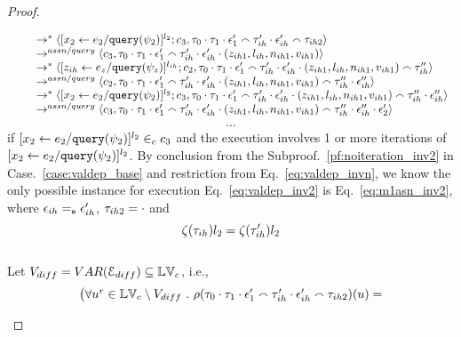 \begin{proof}
\begin{case}
\begin{subcase}
\begin{subsubcase}
\begin{subsubsubcase}
\[\begin{array}{l}
  \qquad \rightarrow^{*} 
  \langle [\mathrel{ {x}_2 \leftarrow e_2 / {\tt query}(\psi_2) }]^{l_2};{c}_3, 
  \mathtt{\tau}_0 \cdot \mathtt{\tau}_1 \cdot \mathtt{\epsilon}_1'  \smallfrown \mathtt{\tau}_{ih}' \cdot \mathtt{\epsilon}_{ih}' \smallfrown \mathtt{\tau}_{ih2} \rangle 
  \\ \qquad
  \rightarrow^{assn/query} 
  \langle {c}_3,  \mathtt{\tau}_0 \cdot \mathtt{\tau}_1 \cdot \mathtt{\epsilon}_1'  \smallfrown \mathtt{\tau}_{ih}' \cdot \mathtt{\epsilon}_{ih}' \cdot (z_{ih1}, l_{ih}, n_{ih1}, v_{ih1}) \rangle 
  \\ \qquad
  \rightarrow^{*} 
  \langle [\mathrel{ z_{ih} \leftarrow e_z / {\tt query}(\psi_z) }]^{l_{ih}};{c}_2, 
  \mathtt{\tau}_0 \cdot \mathtt{\tau}_1 \cdot \mathtt{\epsilon}_1' \smallfrown \mathtt{\tau}_{ih}' \cdot \mathtt{\epsilon}_{ih}' \cdot (z_{ih1}, l_{ih}, n_{ih1}, v_{ih1}) \smallfrown \mathtt{\tau}_{ih}'' \rangle 
  \\ \qquad
  \rightarrow^{assn/query} 
  \langle {c}_2,  \mathtt{\tau}_0 \cdot \mathtt{\tau}_1 \cdot \mathtt{\epsilon}_1'  \smallfrown \mathtt{\tau}_{ih}' \cdot \mathtt{\epsilon}_{ih}' \cdot (z_{ih1}, l_{ih}, n_{ih1}, v_{ih1}) \smallfrown \mathtt{\tau}_{ih}'' \cdot \mathtt{\epsilon}_{ih}'' \rangle  
  \\
  \qquad \rightarrow^{*} 
  \langle [\mathrel{ {x}_2 \leftarrow e_2 / {\tt query}(\psi_2) }]^{l_2};{c}_3, 
  \mathtt{\tau}_0 \cdot \mathtt{\tau}_1 \cdot \mathtt{\epsilon}_1'  \smallfrown \mathtt{\tau}_{ih}' \cdot \mathtt{\epsilon}_{ih}' \cdot (z_{ih1}, l_{ih}, n_{ih1}, v_{ih1}) \smallfrown \mathtt{\tau}_{ih}'' \cdot \mathtt{\epsilon}_{ih}'' \rangle 
  \\ \qquad
  \rightarrow^{assn/query} 
  \langle {c}_3,  \mathtt{\tau}_0 \cdot \mathtt{\tau}_1 \cdot \mathtt{\epsilon}_1' \smallfrown \mathtt{\tau}_{ih}' \cdot \mathtt{\epsilon}_{ih}' \cdot (z_{ih1}, l_{ih}, n_{ih1}, v_{ih1}) \smallfrown \mathtt{\tau}_{ih}'' \cdot \mathtt{\epsilon}_{ih}''\cdot \mathtt{\epsilon}_2' \rangle 
\end{array}
\]
%
 \[\cdots\]
 if $[\mathrel{ {x}_2 \leftarrow e_2 / {\tt query}(\psi_2) }]^{l_2} \in_c c_3$ and the execution involves 1 or more iterations of $[\mathrel{ {x}_2 \leftarrow e_2 / {\tt query}(\psi_2) }]^{l_2}$.
 By conclusion from the Subproof.~\ref{pf:noiteration_inv2} in Case.~\ref{case:valdep_base} and restriction from Eq.~\ref{eq:valdep_invn}, 
 we know the only possible instance for execution Eq.~\ref{eq:valdep_inv2} is Eq.~\ref{eq:m1asn_inv2},
 where $\mathtt{\epsilon}_{ih} =_{\mathtt{e}} \mathtt{\epsilon}_{ih}'$, $\mathtt{\tau}_{ih2} = \cdot$ and
 \[
 \mathtt{\zeta}(\mathtt{\tau}_{ih}) l_2 = \mathtt{\zeta}(\mathtt{\tau}_{ih}') l_2
 \]
%
%
%
\\
Let $V_{diff} = VAR(\mathcal{E}_{diff} ) \subseteq \mathbb{LV}_c$, i.e., 
\[
\begin{array}{l}
  \big(\forall u^r \in \mathbb{LV}_c \setminus V_{diff} ~.~
    \rho(\mathtt{\tau}_0 \cdot \mathtt{\tau}_1 \cdot \mathtt{\epsilon}_1' \smallfrown \mathtt{\tau}_{ih}' \cdot \mathtt{\epsilon}_{ih}' \smallfrown \mathtt{\tau}_{ih2}) (u) =  

\end{array}\]
\end{subsubsubcase}
\end{subsubcase}
\end{subcase}
\end{case}
\end{proof}

